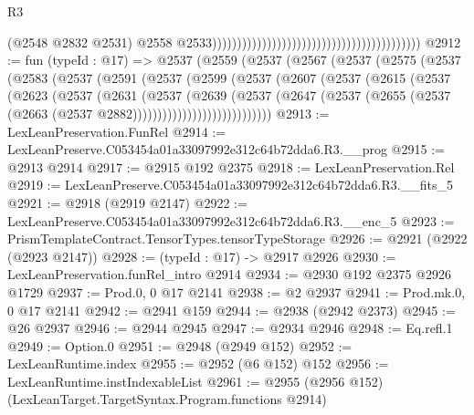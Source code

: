 \begin{lexlean}{R3}
\begin{coremodule}
                                                                                        (@2548
                                                                                          @2832
                                                                                          @2531)
                                                                                        @2558
                                                                                        @2533))))))))))))))))))))))))))))))))))))))))))
@2912 := fun (typeId : @17) =>
  @2537
    (@2559
      (@2537
        (@2567
          (@2537
            (@2575
              (@2537
                (@2583
                  (@2537
                    (@2591
                      (@2537
                        (@2599
                          (@2537
                            (@2607
                              (@2537
                                (@2615
                                  (@2537
                                    (@2623
                                      (@2537
                                        (@2631
                                          (@2537
                                            (@2639
                                              (@2537
                                                (@2647
                                                  (@2537
                                                    (@2655
                                                      (@2537
                                                        (@2663
                                                          (@2537 @2882))))))))))))))))))))))))))))
@2913 := LexLeanPreservation.FunRel
@2914 := LexLeanPreserve.C053454a01a33097992e312c64b72dda6.R3.__prog
@2915 := @2913 @2914
@2917 := @2915 @192 @2375
@2918 := LexLeanPreservation.Rel
@2919 := LexLeanPreserve.C053454a01a33097992e312c64b72dda6.R3.__fits_5
@2921 := @2918 (@2919 @2147)
@2922 := LexLeanPreserve.C053454a01a33097992e312c64b72dda6.R3.__enc_5
@2923 := PrismTemplateContract.TensorTypes.tensorTypeStorage
@2926 := @2921 (@2922 (@2923 @2147))
@2928 := (typeId : @17) -> @2917 @2926
@2930 := LexLeanPreservation.funRel_intro @2914
@2934 := @2930 @192 @2375 @2926 @1729
@2937 := Prod.{0, 0} @17 @2141
@2938 := @2 @2937
@2941 := Prod.mk.{0, 0} @17 @2141
@2942 := @2941 @159
@2944 := @2938 (@2942 @2373)
@2945 := @26 @2937
@2946 := @2944 @2945
@2947 := @2934 @2946
@2948 := Eq.refl.{1}
@2949 := Option.{0}
@2951 := @2948 (@2949 @152)
@2952 := LexLeanRuntime.index
@2955 := @2952 (@6 @152) @152
@2956 := LexLeanRuntime.instIndexableList
@2961 := @2955 (@2956 @152) (LexLeanTarget.TargetSyntax.Program.functions @2914)

\end{coremodule}
\end{lexlean}
